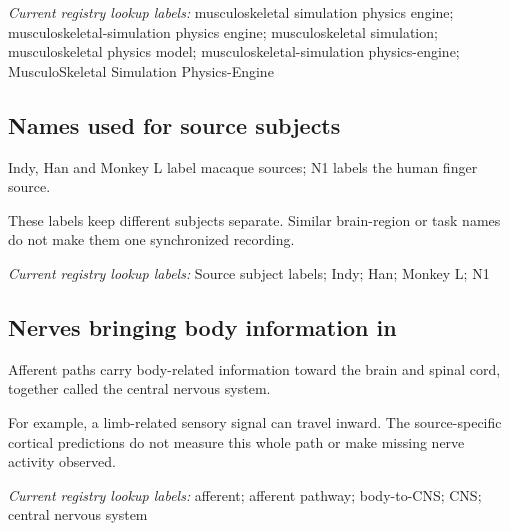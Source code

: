\noindent\textit{Current registry lookup labels:} musculoskeletal simulation physics engine; musculoskeletal-simulation physics engine; musculoskeletal simulation; musculoskeletal physics model; musculoskeletal-simulation physics-engine; MusculoSkeletal Simulation Physics-Engine\par

\begin{samepage}
\subsection*{Names used for source subjects}
\noindent Indy, Han and Monkey L label macaque sources; N1 labels the human finger source.\par
\end{samepage}
\begin{samepage}
\noindent These labels keep different subjects separate. Similar brain-region or task names do not make them one synchronized recording.\par\nopagebreak[4]

\end{samepage}


\noindent\textit{Current registry lookup labels:} Source subject labels; Indy; Han; Monkey L; N1\par

\begin{samepage}
\subsection*{Nerves bringing body information in}
\noindent Afferent paths carry body-related information toward the brain and spinal cord, together called the central nervous system.\par
\end{samepage}
\begin{samepage}
\noindent For example, a limb-related sensory signal can travel inward. The source-specific cortical predictions do not measure this whole path or make missing nerve activity observed.\par\nopagebreak[4]

\end{samepage}


\noindent\textit{Current registry lookup labels:} afferent; afferent pathway; body-to-CNS; CNS; central nervous system\par

